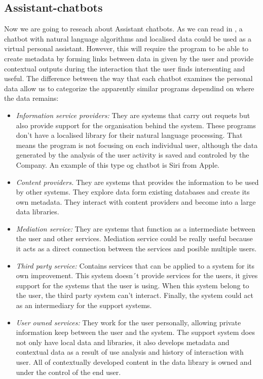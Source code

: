 \documentclass[12pt,twoside]{article}
\theoremstyle{plain}
\theoremstyle{definition}
\theoremstyle{remark}
\begin{document}
		

	\subsection{Assistant-chatbots}
	\label{sec:assistant}
	
	Now we are going to reseach about Assistant chatbots. As we can read in \cite{imrie2013virtual}, a chatbot with natural language algorithms and localised data could be used as a virtual personal assistant. However, this will require the program to be able to create metadata by forming links between data in given by the user and provide contextual outputs during the interaction that the user finds intersenting and useful. The difference between the way that each chatbot examines the personal data allow us to categorize the apparently similar programs dependind on where the data remains:
	\begin{itemize}
\item \textit{Information service providers: }
They are systems that carry out requets but also provide support for the organisation behind the system. These programs don’t have a localised library for their natural language processing. That means the program is not focusing on each individual user, although the data generated by the analysis of the user activity is saved and controled by the Company. An example of this type og chatbot is Siri from Apple.

\item \textit{Content providers.}
They are systems that provides the information to be used by other systems.  They explore data form existing databases and create its own metadata. They interact with content providers and become into a large data libraries.  

\item \textit{Mediation service:}
They are systems that function as a intermediate between the user and other services. Mediation service could be really useful because it acts as a direct connection between the services and posible multiple users. 

\item \textit{Third party service: }
Contains services that can be applied to a system for its own improvement. This system doesn´t provide services for the users, it gives support for the systems that the user is using.  When this system belong to the user, the third party system can’t interact. Finally, the system could act as an intermediary for the support systems. 

\item \textit{User owned services: }
They work for the user personally, allowing private information keep between the user and the system. The support system does not only have local data and libraries, it also develops metadata and contextual data as a result of use analysis and history of interaction with user. All of contextually developed content in the data library is owned and under the control of the end user.
	
\end{itemize}
\end{document}
